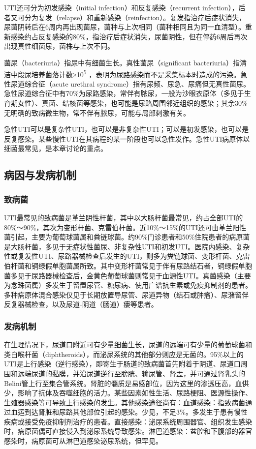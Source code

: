 UTI还可分为初发感染（initial infection）和反复感染（recurrent
infection），后者又可分为复发（relapse）和重新感染（reinfection）。复发指治疗后症状消失，尿菌阴转后在6周内再出现菌尿，菌种与上次相同（菌种相同且为同一血清型）。重新感染约占反复感染的80\%，指治疗后症状消失，尿菌阴性，但在停药6周后再次出现真性细菌尿，菌株与上次不同。

菌尿（bacteriuria）指尿中有细菌生长。真性菌尿（significant
bacteriuria）指清洁中段尿培养菌落计数≥10\textsuperscript{5}
，表明为尿路感染而不是采集标本时造成的污染。急性尿道综合征（acute
urethral
syndrome）指有尿频、尿急、尿痛但无真性菌尿。急性尿道综合征中有70\%为尿路感染，常伴有脓尿，一般为沙眼衣原体（多见于生育期女性）、真菌、结核菌等感染，也可能是尿路周围邻近组织的感染；其余30\%无明确的致病微生物，常不伴有脓尿，可能与局部刺激有关。

急性UTI可以是复杂性UTI，也可以是非复杂性UTI；可以是初发感染，也可以是反复感染。某些慢性UTI在其病程的某一阶段也可以急性发作。急性UTI病原体以细菌最常见，是本章讨论的重点。

\subsection{病因与发病机制}

\subsubsection{致病菌}

UTI最常见的致病菌是革兰阴性杆菌，其中以大肠杆菌最常见，约占全部UTI的80\%～90\%，其次为变形杆菌、克雷伯杆菌。近10\%～15\%的UTI还可由革兰阳性菌引起，主要为葡萄球菌属和粪链球菌。约90\%门诊患者和50\%住院患者的病原菌是大肠杆菌，多见于无症状性菌尿、非复杂性UTI和初发UTI。医院内感染、复杂性或复发性UTI、尿路器械检查后发生的UTI，则多为粪链球菌、变形杆菌、克雷伯杆菌和铜绿假单胞菌属所致。其中变形杆菌常见于伴有尿路结石者，铜绿假单胞菌多见于尿路器械检查后，金黄色葡萄球菌则常见于血源性UTI。真菌感染（主要为念珠菌属）多发生于留置尿管、糖尿病、使用广谱抗生素或免疫抑制剂的患者。多种病原体混合感染仅见于长期放置导尿管、尿道异物（结石或肿瘤）、尿潴留伴反复器械检查，以及尿道-阴道（肠道）瘘等患者。

\subsubsection{发病机制}

在生理情况下，尿道口附近可有少量细菌生长，尿道的远端可有少量的葡萄球菌和类白喉杆菌（diphtheroids），而泌尿系统的其他部分则应是无菌的。95\%以上的UTI是上行感染（逆行感染），即寄生于肠道的致病菌首先附着于阴道、尿道口周围和远端尿道的黏膜，并沿尿道逆行至膀胱、输尿管、肾盂，并可通过肾乳头的Belini管上行至集合管系统。肾脏的髓质是易感部位，因为这里的渗透压高，血供少，影响了抗体及吞噬细胞的活力。某些因素如性生活、尿路梗阻、医源性操作、生殖器感染等可导致上行感染的发生。其他感染途径尚有：血道感染：指致病菌通过血运到达肾脏和尿路其他部位引起的感染。少见，不足3\%。多发生于患有慢性疾病或接受免疫抑制剂治疗的患者。直接感染：泌尿系统周围器官、组织发生感染时，病原菌偶可直接侵入到泌尿系统导致感染。淋巴道感染：盆腔和下腹部的器官感染时，病原菌可从淋巴道感染泌尿系统，但罕见。

